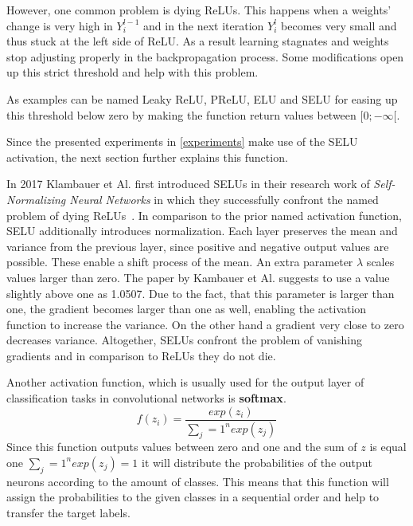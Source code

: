 However, one common problem is dying \glspl{ReLU}.
This happens when a weights' change is very high in $Y_i^{l-1}$ and in the next iteration $Y_i^l$ becomes very small
and thus stuck at the left side of \gls{ReLU}.
As a result learning stagnates and weights
stop adjusting properly in the backpropagation process.
Some modifications open up this strict threshold and help with this problem.

As examples can be named Leaky ReLU, \gls{PReLU}, \gls{ELU} and \gls{SELU} for easing up this threshold
below zero by making the function return values between
$[0;-\infty[$.

Since the presented experiments in \autoref{experiments} make use of the \gls{SELU} activation,
the next section further explains this function.


In 2017 Klambauer et Al. first introduced \glspl{SELU} in their research work of
\textit{Self-Normalizing Neural Networks} in which they successfully confront the named problem of dying
\glspl{ReLU}~\cite{seluorigin}.
In comparison to the prior named activation function, \gls{SELU} additionally introduces normalization.
Each layer preserves the mean and variance from the previous layer, since positive and negative output values
are possible. These enable a shift process of the mean.
An extra parameter $\lambda$ scales values larger than zero.
The paper by Kambauer et Al. suggests to use a value slightly above one as 1.0507.
Due to the fact, that this parameter is larger than one, the gradient becomes larger than one as well, enabling
the activation function to increase the variance.
On the other hand a gradient very close to zero decreases variance.
Altogether, \glspl{SELU} confront the problem of vanishing gradients and in comparison to \glspl{ReLU} they do
not die.

Another activation function, which is usually used for the output layer of classification tasks in
convolutional networks is \textbf{softmax}.
\begin{equation}
    f(z_i)=\frac{exp(z_i)}{\sum_j=1^n exp(z_j)}
\end{equation}
Since this function outputs values between zero and one and the sum of $z$ is equal one $\sum_j=1^n exp(z_j)=1$
it will distribute the probabilities of the output neurons according to the amount of classes.
This means that this function will assign the probabilities to the given classes in a sequential order and help
to transfer the target labels.


